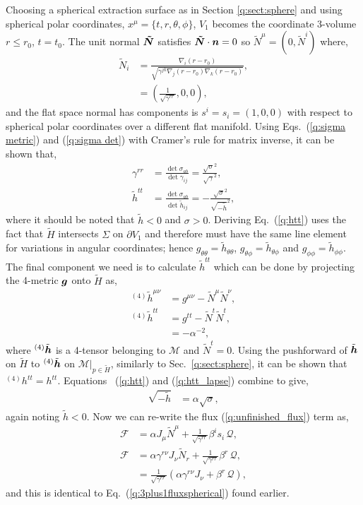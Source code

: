 Choosing a spherical extraction surface as in Section \ref{q:sect:sphere} and using spherical polar coordinates, $x^\mu = \{t,r,\theta,\phi\}$, $V_1$ becomes the coordinate 3-volume $r\leq r_0$, $t=t_0$. The unit normal $\boldsymbol{\tilde{N}}$ satisfies $\boldsymbol{\tilde{N}}\cdot \boldsymbol{n} =0$ so $\tilde N^\mu = (0,\tilde N^i)$ where, 
\begin{align}
\tilde N_i &= \frac{\nabla_i (r-r_0)}{\sqrt{\gamma^{jk}\nabla_j (r-r_0) \nabla_k (r-r_0)}}, \\ 
 &= (\frac{1}{\sqrt{\gamma^{rr}}},0,0),
\end{align}
and the flat space normal has components is $s^i = s_i = (1,0,0)$ with respect to spherical polar coordinates over a different flat manifold. Using Eqs.~(\ref{q:sigma metric}) and (\ref{q:sigma det}) with Cramer's rule for matrix inverse, it can be shown that,
\begin{align}
\gamma^{rr} &= \frac{\det \sigma_{ab}}{ \det \gamma_{ij}} = \frac{\sqrt{\sigma}^2}{\sqrt{\gamma}^2}, \\ 
\label{q:htt}\tilde{h}^{tt} &= \frac{\det \sigma_{ab}}{\det \tilde h_{ij}} = -\frac{\sqrt{\sigma}^2}{\sqrt{-\tilde h}^2},
\end{align}
where it should be noted that $\tilde h < 0$ and $\sigma > 0$. Deriving Eq.~(\ref{q:htt}) uses the fact that $\tilde H$ intersects $\Sigma$ on $\partial V_1$ and therefore must have the same line element for variations in angular coordinates; hence $g_{\theta\theta}=\tilde{h}_{\theta\theta}$, $g_{\theta\phi}=\tilde{h}_{\theta\phi}$ and $g_{\phi\phi}=\tilde{h}_{\phi\phi}$. The final component we need is to calculate $\tilde h^{tt}$ which can be done by projecting the 4-metric $\boldsymbol g$ onto $\tilde H$ as, 
\begin{align}
{}^{(4)}\tilde{h}^{\mu\nu} &= g^{\mu\nu} - \tilde{N}^\mu \tilde{N}^\nu,\\
{}^{(4)}\tilde{h}^{tt} &= g^{tt} - \tilde{N}^t\tilde{N}^t,\\
         \label{q:htt_lapse}      &= -\alpha^{-2},
\end{align}
where ${}^{(4)}\tilde{\boldsymbol{h}}$ is a 4-tensor belonging to $\mathcal{M}$ and $\tilde{N}^t=0$. Using the pushforward of $\tilde{\boldsymbol h}$ on $\tilde H$ to ${}^{(4)}\tilde{\boldsymbol h}$ on $\mathcal{M}\vert_{p\in{\tilde H}}$, similarly to Sec.~\ref{q:sect:sphere}, it can be shown that ${}^{(4)}h^{tt}=h^{tt}$. Equations ~(\ref{q:htt}) and (\ref{q:htt_lapse}) combine to give,
\begin{align}
  \sqrt{-\tilde{h}} &= \alpha \sqrt{\sigma},
\end{align}
again noting $\tilde h<0$. Now we can re-write the flux (\ref{q:unfinished_flux}) term as, 
\begin{align}
\mathcal{F} &= \alpha J_\mu \tilde N^\mu +  \frac{1}{\sqrt{\gamma^{rr}}}\beta^i s_i\, \mathcal{Q} , \\
\mathcal{F} &= \alpha\gamma^{ r\nu} J_\nu \tilde N_r +  \frac{1}{\sqrt{\gamma^{rr}}}\beta^r \, \mathcal{Q} , \\
            &= \frac{1}{\sqrt{\gamma^{rr}}}( \alpha \gamma^{ r\nu} J_\nu +  \beta^r \, \mathcal{Q} ), 
\end{align} 
and this is identical to Eq.~(\ref{q:3plus1fluxspherical}) found earlier.


